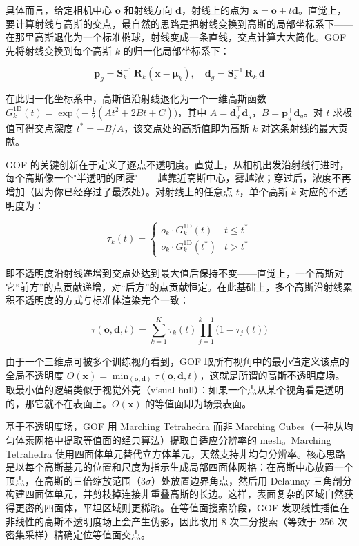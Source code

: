 具体而言，给定相机中心 $\mathbf{o}$ 和射线方向 $\mathbf{d}$，射线上的点为 $\mathbf{x} = \mathbf{o} + t\mathbf{d}$。直觉上，要计算射线与高斯的交点，最自然的思路是把射线变换到高斯的局部坐标系下——在那里高斯退化为一个标准椭球，射线变成一条直线，交点计算大大简化。GOF 先将射线变换到每个高斯 $k$ 的归一化局部坐标系下：

\begin{equation}
\mathbf{p}_g = \mathbf{S}_k^{-1}\,\mathbf{R}_k (\mathbf{x} - \boldsymbol{\mu}_k), \quad \mathbf{d}_g = \mathbf{S}_k^{-1}\,\mathbf{R}_k\,\mathbf{d}
\end{equation}

在此归一化坐标系中，高斯值沿射线退化为一个一维高斯函数 $G_k^{\text{1D}}(t) = \exp\!\bigl(-\frac{1}{2}(At^2 + 2Bt + C)\bigr)$，其中 $A = \mathbf{d}_g^\top\mathbf{d}_g$，$B = \mathbf{p}_g^\top\mathbf{d}_g$。对 $t$ 求极值可得交点深度 $t^* = -B/A$，该交点处的高斯值即为高斯 $k$ 对这条射线的最大贡献。

GOF 的关键创新在于定义了逐点不透明度。直觉上，从相机出发沿射线行进时，每个高斯像一个"半透明的团雾"——越靠近高斯中心，雾越浓；穿过后，浓度不再增加（因为你已经穿过了最浓处）。对射线上的任意点 $t$，单个高斯 $k$ 对应的不透明度为：

\begin{equation}
\tau_k(t) = \begin{cases} o_k \cdot G_k^{\text{1D}}(t) & t \leq t^* \\ o_k \cdot G_k^{\text{1D}}(t^*) & t > t^* \end{cases}
\end{equation}

即不透明度沿射线递增到交点处达到最大值后保持不变——直觉上，一个高斯对它“前方”的点贡献递增，对“后方”的点贡献恒定。在此基础上，多个高斯沿射线累积不透明度的方式与标准体渲染完全一致：

\begin{equation}
\tau(\mathbf{o}, \mathbf{d}, t) = \sum_{k=1}^{K} \tau_k(t) \prod_{j=1}^{k-1}\bigl(1 - \tau_j(t)\bigr)
\end{equation}

由于一个三维点可被多个训练视角看到，GOF 取所有视角中的最小值定义该点的全局不透明度 $O(\mathbf{x}) = \min_{(\mathbf{o},\mathbf{d})} \tau(\mathbf{o}, \mathbf{d}, t)$，这就是所谓的高斯不透明度场。取最小值的逻辑类似于视觉外壳（visual hull）：如果一个点从某个视角看是透明的，那它就不在表面上。$O(\mathbf{x})$ 的等值面即为场景表面。

基于不透明度场，GOF 用 Marching Tetrahedra 而非 Marching Cubes（一种从均匀体素网格中提取等值面的经典算法）提取自适应分辨率的 mesh。Marching Tetrahedra 使用四面体单元替代立方体单元，天然支持非均匀分辨率。核心思路是以每个高斯基元的位置和尺度为指示生成局部四面体网格：在高斯中心放置一个顶点，在高斯的三倍缩放范围（$3\sigma$）处放置边界角点，然后用 Delaunay 三角剖分构建四面体单元，并剪枝掉连接非重叠高斯的长边。这样，表面复杂的区域自然获得更密的四面体，平坦区域则更稀疏。在等值面搜索阶段，GOF 发现线性插值在非线性的高斯不透明度场上会产生伪影，因此改用 8 次二分搜索（等效于 256 次密集采样）精确定位等值面交点。

